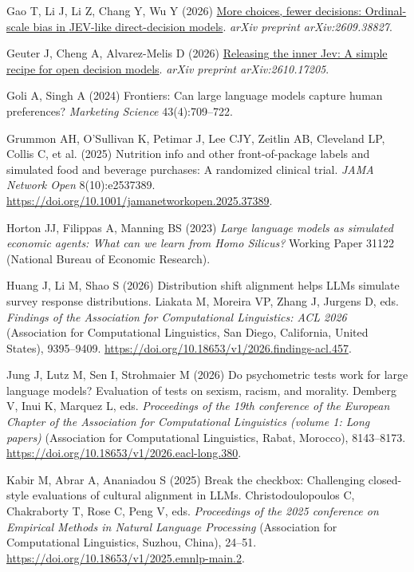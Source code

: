 \documentclass[
  letterpaper,
  DIV=11,
  numbers=noendperiod]{scrartcl}
\newlength{\cslhangindent}
\newenvironment{CSLReferences}[2] %
 {\begin{list}{}{%
  \setlength{\itemindent}{0pt}
  \setlength{\leftmargin}{0pt}
  \setlength{\parsep}{0pt}
  \ifodd #1
   \setlength{\leftmargin}{\cslhangindent}
   \setlength{\itemindent}{-1\cslhangindent}
  \fi
  \setlength{\itemsep}{#2\baselineskip}}}
 {\end{list}}
\begin{document}
\begin{CSLReferences}{1}{0}
Gao T, Li J, Li Z, Chang Y, Wu Y (2026)
\href{https://arxiv.org/abs/2609.38827}{More choices, fewer decisions:
Ordinal-scale bias in {JEV}-like direct-decision models}. \emph{arXiv
preprint arXiv:2609.38827}.

Geuter J, Cheng A, Alvarez-Melis D (2026)
\href{https://arxiv.org/abs/2610.17205}{Releasing the inner {Jev}: A
simple recipe for open decision models}. \emph{arXiv preprint
arXiv:2610.17205}.

Goli A, Singh A (2024) Frontiers: Can large language models capture
human preferences? \emph{Marketing Science} 43(4):709--722.

Grummon AH, O'Sullivan K, Petimar J, Lee CJY, Zeitlin AB, Cleveland LP,
Collis C, et al. (2025) Nutrition info and other front-of-package labels
and simulated food and beverage purchases: A randomized clinical trial.
\emph{JAMA Network Open} 8(10):e2537389.
\url{https://doi.org/10.1001/jamanetworkopen.2025.37389}.

Horton JJ, Filippas A, Manning BS (2023) \emph{Large language models as
simulated economic agents: What can we learn from {Homo Silicus}?}
Working Paper 31122 (National Bureau of Economic Research).

Huang J, Li M, Shao S (2026) Distribution shift alignment helps {LLM}s
simulate survey response distributions. Liakata M, Moreira VP, Zhang J,
Jurgens D, eds. \emph{Findings of the {A}ssociation for {C}omputational
{L}inguistics: {ACL} 2026} (Association for Computational Linguistics,
San Diego, California, United States), 9395--9409.
\url{https://doi.org/10.18653/v1/2026.findings-acl.457}.

Jung J, Lutz M, Sen I, Strohmaier M (2026) Do psychometric tests work
for large language models? Evaluation of tests on sexism, racism, and
morality. Demberg V, Inui K, Marquez L, eds. \emph{Proceedings of the
19th conference of the {European Chapter of the Association for
Computational Linguistics} (volume 1: Long papers)} (Association for
Computational Linguistics, Rabat, Morocco), 8143--8173.
\url{https://doi.org/10.18653/v1/2026.eacl-long.380}.

Kabir M, Abrar A, Ananiadou S (2025) Break the checkbox: Challenging
closed-style evaluations of cultural alignment in {LLM}s.
Christodoulopoulos C, Chakraborty T, Rose C, Peng V, eds.
\emph{Proceedings of the 2025 conference on {Empirical Methods in
Natural Language Processing}} (Association for Computational
Linguistics, Suzhou, China), 24--51.
\url{https://doi.org/10.18653/v1/2025.emnlp-main.2}.


\end{CSLReferences}
\end{document}
